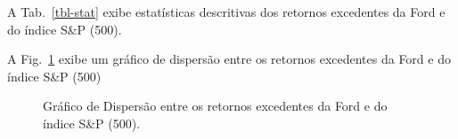 \documentclass[
  12pt,
  a4paperpaper,
]{article}
\begin{document}
\begin{table}

\caption{\label{tbl-stat}Estatísticas Descritivas para Retornos
Excedentes}


\end{table}%

A Tab.~\ref{tbl-stat} exibe estatísticas descritivas dos retornos
excedentes da Ford e do índice S\&P (500).

\pagebreak

A Fig.~\ref{fig-dispersao} exibe um gráfico de dispersão entre os
retornos excedentes da Ford e do índice S\&P (500)

\begin{figure}[H]


\caption{\label{fig-dispersao}Gráfico de Dispersão entre os retornos
excedentes da Ford e do índice S\&P (500).}

\end{figure}%
\end{document}
